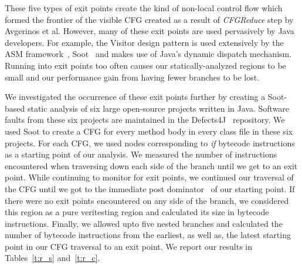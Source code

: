 These five types of exit points create the kind of non-local control flow which formed the frontier of the visible CFG created as a result of \textit{CFGReduce} step by Avgerinos et al.
%
However, many of these exit points are used pervasively by Java developers.
%
For example, the Visitor design pattern is used extensively by the ASM framework~\cite{asm}, Soot~\cite{soot} and makes use of Java\rq s dynamic dispatch mechanism.
%
Running into exit points too often causes our statically-analyzed regions to be small and our performance gain from having fewer branches to be lost.

We investigated the occurrence of these exit points further by creating a Soot-based static analysis of six large open-source projects written in Java.
%
Software faults from these six projects are maintained in the Defects4J~\cite{defects4j} repository.
%
We used Soot to create a CFG for every method body in every class file in these six projects.
%
For each CFG, we used nodes corresponding to \textit{if} bytecode instructions as a starting point of our analysis.
%
We measured the number of instructions encountered when traversing down each side of the branch until we get to an exit point.
%
While continuing to monitor for exit points, we continued our traversal of the CFG until we got to the immediate post dominator~\cite{dragon-book} of our starting point.
%
If there were no exit points encountered on any side of the branch, we considered this region as a pure veritesting region and calculated its size in bytecode instructions.
%
Finally, we allowed upto five nested branches and calculated the number of bytecode instructions from the earliest, as well as, the latest starting point in our CFG traversal to an exit point.
%
We report our results in Tables~\ref{t:r_s} and~\ref{t:r_c}.

